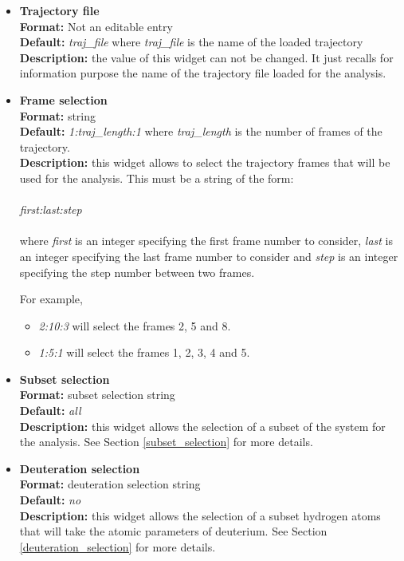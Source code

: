 \documentclass[a4paper,11pt]{report}
\begin{document}
\hypertarget{rog_trajectory_file}{}
\begin{itemize}
\item \textbf{Trajectory file}\\
\textbf{Format:} Not an editable entry\\
\textbf{Default:} \textit{traj\_file} where \textit{traj\_file} is the name of the loaded trajectory\\
\textbf{Description:} the value of this widget can not be changed. It just recalls for information purpose the name
of the trajectory file loaded for the analysis.

\hypertarget{rog_frame_selection}{}
\item \textbf{Frame selection}\\
\textbf{Format:} string\\
\textbf{Default:} \textit{1:traj\_length:1} where \textit{traj\_length} is the number of frames of the trajectory.\\
\textbf{Description:} this widget allows to select the trajectory frames that will be used for the analysis. This must
be a string of the form:
\\\\
\textit{first:last:step}
\\\\
where \textit{first} is an integer specifying the first frame number to consider, \textit{last} is an integer specifying the last 
frame number to consider and \textit{step} is an integer specifying the step number between two frames.

For example,
\begin{itemize}
\item \textit{2:10:3} will select the frames 2, 5 and 8.
\item \textit{1:5:1} will select the frames 1, 2, 3, 4 and 5.
\end{itemize}

\hypertarget{rog_subset_selection}{}
\item \textbf{Subset selection}\\
\textbf{Format:} subset selection string\\
\textbf{Default:} \textit{all}\\
\textbf{Description:} this widget allows the selection of a subset of the system for the analysis. 
See Section \ref{subset_selection} for more details.

\hypertarget{rog_deuteration_selection}{}
\item \textbf{Deuteration selection}\\
\textbf{Format:} deuteration selection string\\
\textbf{Default:} \textit{no}\\
\textbf{Description:} this widget allows the selection of a subset hydrogen atoms that will take the atomic parameters 
of deuterium. See Section \ref{deuteration_selection} for more details.


\end{itemize}
\end{document}
